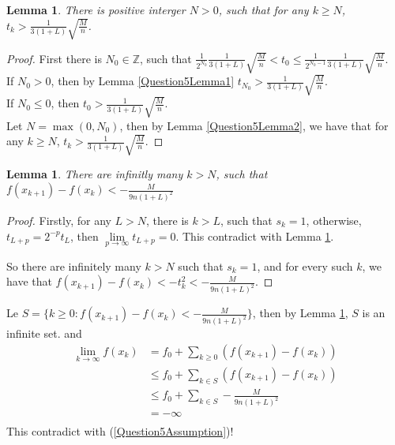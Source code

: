 \documentclass[pdf]{article}
\newtheorem{lemma}[theorem]{Lemma}
\begin{document}
\begin{lemma}\label{Question5Lemma3}
There is positive interger $N>0$, such that for any $k\geq N$, $t_k > \frac{1}{3(1+L)}\sqrt{\frac{M}{n}}$.
\end{lemma}
\begin{proof} 
First there is $N_0\in \mathbb{Z}$, such that $\frac{1}{ 2^{N_0}}\frac{1}{3 (1+L)}\sqrt{\frac{M}{n}}< t_0 \leq \frac{1}{ 2^{N_0-1}}\frac{1}{3 (1+L)}\sqrt{\frac{M}{n}}$.\\

If $N_0> 0$, then by Lemma \ref{Question5Lemma1} $t_{N_0} > \frac{1}{3(1+L)}\sqrt{\frac{M}{n}}$.\\

If $N_0 \leq 0$, then $t_0 > \frac{1}{3(1+L)}\sqrt{\frac{M}{n}}$.\\

Let $N = \max(0, N_0)$, then by Lemma \ref{Question5Lemma2}, we have that for any $k\geq N$, $t_k > \frac{1}{3(1+L)}\sqrt{\frac{M}{n}}$.
\end{proof}

\begin{lemma}\label{Question5Lemma4}
There are infinitly many $k>N$, such that $f(x_{k+1}) - f(x_k) < -\frac{M}{9n(1+L)^2}$
\end{lemma}
\begin{proof}
Firstly, for any $L > N$, there is $k>L$, such that $s_k = 1$, otherwise, $t_{L+p} = 2^{-p}t_L$, then $\lim\limits_{p\to\infty}t_{L+p} = 0$. This contradict with Lemma \ref{Question5Lemma3}.

So there are infinitely many $k>N$ such that $s_k=1$, and for every such $k$, we have that $f(x_{k+1}) - f(x_k) < -t_k^2 < -\frac{M}{9n(1+L)^2}$.
\end{proof}

Le $S = \{ k\geq 0: f(x_{k+1}) - f(x_k) < -\frac{M}{9n(1+L)^2}\}$, then by Lemma \ref{Question5Lemma4}, $S$ is an infinite set. and
\begin{align*}
\lim\limits_{k\to\infty} f(x_k) &= f_0 + \sum\limits_{k\geq 0}(f(x_{k+1})-f(x_k))\\
 				    &\leq f_0 + \sum\limits_{k\in S}(f(x_{k+1})-f(x_k))\\
 				    &\leq f_0 + \sum\limits_{k\in S} - \frac{M}{9n(1+L)^2}\\
 				    &= -\infty \\
\end{align*}
This contradict with (\ref{Question5Assumption})!
\newpage
\end{document}
